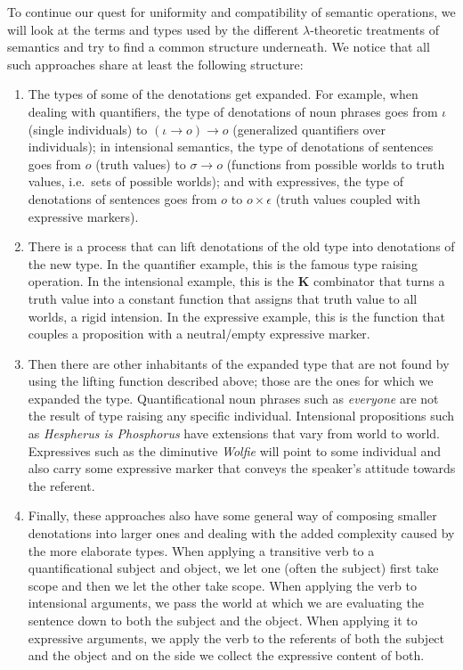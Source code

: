 To continue our quest for uniformity and compatibility of semantic
operations, we will look at the terms and types used by the different
$\lambda$-theoretic treatments of semantics and try to find a common
structure underneath. We notice that all such approaches share at least the
following structure:

\begin{enumerate}
\item \label{item:type-transformation} The types of some of the denotations
  get expanded. For example, when dealing with quantifiers, the type of
  denotations of noun phrases goes from $\iota$ (single individuals) to
  $(\iota \to o) \to o$ (generalized quantifiers over individuals); in
  intensional semantics, the type of denotations of sentences goes from $o$
  (truth values) to $\sigma \to o$ (functions from possible worlds to truth
  values, i.e.\ sets of possible worlds); and with expressives, the type of
  denotations of sentences goes from $o$ to $o \times \epsilon$ (truth
  values coupled with expressive markers).
\item \label{item:monad-eta} There is a process that can lift denotations
  of the old type into denotations of the new type. In the quantifier
  example, this is the famous type raising operation. In the intensional
  example, this is the $\textbf{K}$ combinator that turns a truth value
  into a constant function that assigns that truth value to all worlds, a
  rigid intension. In the expressive example, this is the function that
  couples a proposition with a neutral/empty expressive marker.
\item Then there are other inhabitants of the expanded type that are not
  found by using the lifting function described above; those are the ones
  for which we expanded the type. Quantificational noun phrases such as
  \emph{everyone} are not the result of type raising any specific
  individual. Intensional propositions such as \emph{Hespherus is
    Phosphorus} have extensions that vary from world to world. Expressives
  such as the diminutive \emph{Wolfie} will point to some individual and
  also carry some expressive marker that conveys the speaker's attitude
  towards the referent.
\item \label{item:monad-mu} Finally, these approaches also have some
  general way of composing smaller denotations into larger ones and dealing
  with the added complexity caused by the more elaborate types. When
  applying a transitive verb to a quantificational subject and object, we
  let one (often the subject) first take scope and then we let the other
  take scope. When applying the verb to intensional arguments, we pass the
  world at which we are evaluating the sentence down to both the subject
  and the object. When applying it to expressive arguments, we apply the
  verb to the referents of both the subject and the object and on the side
  we collect the expressive content of both.
\end{enumerate}

